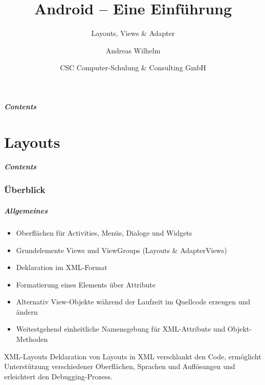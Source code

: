 \title{Android -- Eine Einführung}
\subtitle{Layouts, Views \& Adapter}
\author[A. Wilhelm]{Andreas Wilhelm}
\titlegraphic{}
\date{CSC Computer-Schulung \& Consulting GmbH}

\begin{frame}[plain]
  \titlepage
\end{frame}

\section[Contents]{}
\begin{frame}
	\frametitle{Contents}
	\tableofcontents[onlyparts]
\end{frame}

\part{Layouts}
\frame{\partpage}
\begin{frame}
	\frametitle{Contents}
	\tableofcontents[]
\end{frame}

\section{Überblick}
\begin{frame}
   \frametitle{Allgemeines}
   \begin{itemize}
      \item Oberflächen für Activities, Menüs, Dialoge und Widgets
      \item Grundelemente Views und ViewGroups (Layouts \& AdapterViews)
      \item Deklaration im XML-Format
      \item Formatierung eines Elements über Attribute
      \item Alternativ View-Objekte während der Laufzeit im Quellcode 
         erzeugen und ändern
      \item Weitestgehend einheitliche Namensgebung für XML-Attribute 
         und Objekt-Methoden
   \end{itemize}

   \begin{alertblock}{XML-Layouts}
      Deklaration von Layouts in XML verschlankt den Code, 
      ermöglicht Unterstützung verschiedener Oberflächen, Sprachen 
      und Auflösungen und erleichtert den Debugging-Prozess.
   \end{alertblock}
\end{frame}

